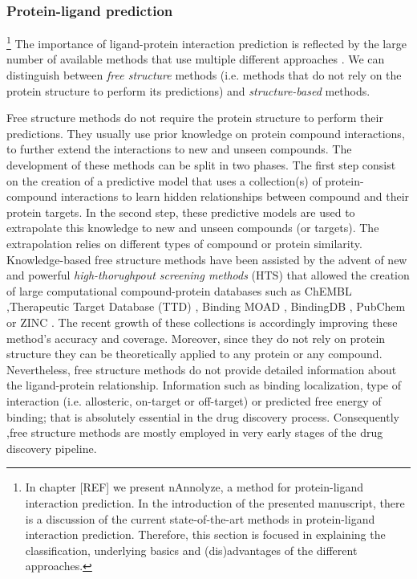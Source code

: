 \documentclass[12pt, a4paper,twoside]{tesi_upf}
\begin{document}
\subsubsection{Protein-ligand prediction}

\par  \footnote{In chapter [REF] we present nAnnolyze, a method for protein-ligand interaction prediction. In the introduction of the presented manuscript, there is a discussion of the current state-of-the-art methods in protein-ligand interaction prediction. Therefore, this section is focused in explaining the classification, underlying basics and (dis)advantages of the different approaches.} The importance of ligand-protein interaction prediction is reflected by the large number of available methods that use multiple different approaches \cite{Csermely2013, prathipati2015}. We can distinguish between \textit{free structure} methods (i.e. methods that do not rely on the protein structure to perform its predictions) and \textit{structure-based} methods.    
\par Free structure methods do not require the protein structure to perform their predictions. They usually use prior knowledge on protein compound interactions, to further extend the interactions to new and unseen compounds. The development of these methods can be split in two phases. The first step consist on the creation of a predictive model that uses a collection(s) of protein-compound interactions to learn hidden relationships between compound and their protein targets.  In the second step, these predictive models are used to extrapolate this knowledge to new and unseen compounds (or targets). The extrapolation relies on different types of compound or protein similarity. Knowledge-based free structure methods have been assisted by the advent of new and powerful \textit{high-thorughpout screening methods} (HTS) that allowed the creation of large computational compound-protein databases such as ChEMBL \cite{Bento2014},Therapeutic Target Database (TTD) \cite{Zhu2012a}, Binding MOAD \cite{Hu2005}, BindingDB \cite{Liu2007}, PubChem \cite{Kim2016, Wang2014} or ZINC \cite{Irwin2012}. The recent growth of these collections is accordingly improving these method's accuracy and coverage. Moreover, since they do not rely on protein structure they can be theoretically applied to any protein or any compound. Nevertheless, free structure methods do not provide detailed information about the ligand-protein relationship. Information such as binding localization, type of interaction (i.e. allosteric, on-target or off-target) or predicted free energy of binding;  that is absolutely essential in the drug discovery process. Consequently ,free structure methods are mostly employed in very early stages of the drug discovery pipeline. 
\end{document}
